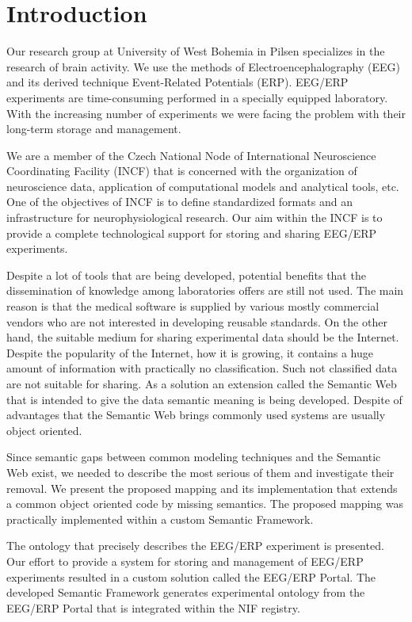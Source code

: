 \documentclass[conference]{IEEEtran}
\begin{document}
\section{Introduction}

Our research group at University of West Bohemia in Pilsen specializes in the research of brain activity. We use the methods of Electroencephalography (EEG) and its derived technique Event-Related Potentials (ERP). EEG/ERP experiments are time-consuming performed in a specially equipped laboratory. With the increasing number of experiments we were facing the problem with their long-term storage and management.

We are a member of the Czech National Node of International Neuroscience Coordinating Facility (INCF) that is concerned with the organization of neuroscience data,
application of computational models and analytical tools, etc. One of the objectives of INCF is to define standardized formats and  an infrastructure for neurophysiological research. Our aim within the INCF is to provide a complete technological support for storing and sharing EEG/ERP experiments.

Despite a lot of tools that are being developed, potential benefits that the dissemination of knowledge among laboratories offers are still not used. The main reason is that the medical software is supplied by various mostly commercial vendors who are not interested in developing reusable standards. On the other hand, the suitable medium for sharing experimental data should be the Internet. Despite the popularity of the Internet, how it is growing, it contains a huge amount of information with practically no classification. Such not classified data are not suitable for sharing. As a solution an extension called the Semantic Web that is intended to give the data semantic meaning is being developed. Despite of advantages that the Semantic Web brings commonly used systems are usually object oriented.

Since semantic gaps between common modeling techniques and the Semantic Web exist, we needed to describe the most serious of them and investigate their removal. We present the proposed mapping and its implementation that extends a common object oriented code by missing semantics. The proposed mapping was practically implemented within a custom Semantic Framework.

The ontology that precisely describes the EEG/ERP experiment is presented. Our effort to provide a system for storing and management of EEG/ERP experiments resulted in a custom solution called the EEG/ERP Portal. The developed Semantic Framework generates experimental ontology from the EEG/ERP Portal that is integrated within the NIF registry.
\end{document}
